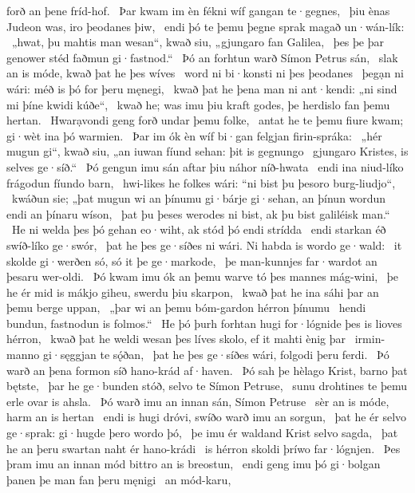 forð an þene fríd-hof. \hld\ Þar kwam im èn fékni wíf
gangan te·gegnes, \hld\ þiu ènas Judeon was,
iro þeodanes þiw, \hld\ endi þó te þemu þegne sprak
magað un·wán-lík: \hld\ „hwat, þu mahtis man wesan“, kwað siu,
„gjungaro fan Galilea, \hld\ þes þe þar genower stéd
faðmun gi·fastnod.“ \hld\ Þó an forhtun warð
Símon Petrus sán, \hld\ slak an is móde,
kwað þat he þes wíves \hld\ word ni bi·konsti
ni þes þeodanes \hld\ þegạn ni wári:
méð is þó for þeru męnegi, \hld\ kwað þat he þena man ni ant·kendi:
„ni sind mi þíne kwidi kúðe“, \hld\ kwað he; was imu þiu kraft godes,
þe herdislo fan þemu hertan. \hld\ Hwarạvondi geng
forð undar þemu folke, \hld\ antat he te þemu fiure kwam;
gi·wèt ina þó warmien. \hld\ Þar im ók èn wíf bi·gan
felgjan firin-spráka: \hld\ „hér mugun gi“, kwað siu, „an iuwan fíund sehan:
þit is gegnungo \hld\ gjungaro Kristes,
is selves ge·síð.“ \hld\ Þó gengun imu sán aftar þiu
náhor níð-hwata \hld\ endi ina niud-líko
frágodun fíundo barn, \hld\ hwi-likes he folkes wári:
“ni bist þu þesoro burg-liudjo“, \hld\ kwáðun sie; „þat mugun wi an þínumu gi·bárje gi·sehan,
an þínun wordun endi an þínaru wíson, \hld\ þat þu þeses werodes ni bist,
ak þu bist galiléisk man.“ \hld\ He ni welda þes þó gehan eo·wiht,
ak stód þó endi strídda \hld\ endi starkan éð
swíð-líko ge·swór, \hld\ þat he þes ge·síðes ni wári.
Ni habda is wordo ge·wald: \hld\ it skolde gi·werðen só,
só it þe ge·markode, \hld\ þe man-kunnjes
far·wardot an þesaru wer-oldi. \hld\ Þó kwam imu ók an þemu warve tó
þes mannes mág-wini, \hld\ þe he ér mid is mákjo giheu, %
swerdu þiu skarpon, \hld\ kwað þat he ina sáhi þar
an þemu berge uppan, \hld\ „þar wi an þemu bóm-gardon
hérron þínumu \hld\ hendi bundun,
fastnodun is folmos.“ \hld\ He þó þurh forhtan hugi
for·lógnide þes is lioves hérron, \hld\ kwað þat he weldi wesan þes líves skolo,
ef it mahti ènig þar \hld\ irmin-manno
gi·sęggjan te sǫ́ðan, \hld\ þat he þes ge·síðes wári,
folgodi þeru ferdi. \hld\ Þó warð an þena formon síð
hano-krád af·haven. \hld\ Þó sah þe hèlago Krist,
barno þat bętste, \hld\ þar he ge·bunden stóð,
selvo te Símon Petruse, \hld\ sunu drohtines
te þemu erle ovar is ahsla. \hld\ Þó warð imu an innan sán,
Símon Petruse \hld\ sèr an is móde,
harm an is hertan \hld\ endi is hugi dróvi,
swíðo warð imu an sorgun, \hld\ þat he ér selvo ge·sprak:
gi·hugde þero wordo þó, \hld\ þe imu ér waldand Krist
selvo sagda, \hld\ þat he an þeru swartan naht
ér hano-krádi \hld\ is hérron skoldi
þríwo far·lógnjen. \hld\ Þes þram imu an innan mód
bittro an is breostun, \hld\ endi geng imu þó gi·bolgan þanen
þe man fan þeru męnigi \hld\ an mód-karu,
